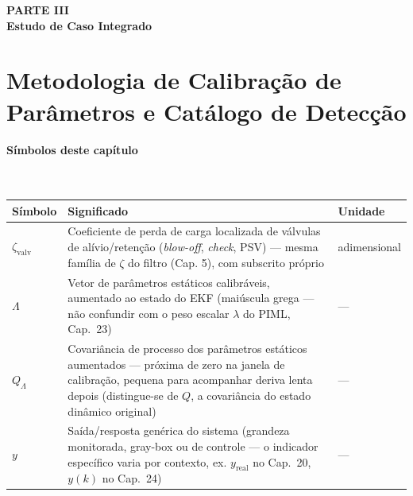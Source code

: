 \documentclass[12pt,a4paper]{article}
\numberwithin{equation}{section}
\numberwithin{table}{section}
\numberwithin{figure}{section}
\begin{document}
\clearpage
\thispagestyle{empty}
{}
\vspace*{\fill}
\begin{center}
	{\Huge\bfseries PARTE III}\\[2em]
	{\huge\bfseries Estudo de Caso Integrado}
\end{center}
\vspace*{\fill}
\clearpage


\clearpage
\section{Metodologia de Calibração de Parâmetros e Catálogo de Detecção}

\paragraph{Símbolos deste capítulo}\mbox{}\\[-0.5em]
{\small
\begin{longtable}{>{\raggedright\arraybackslash}p{2.6cm} >{\raggedright\arraybackslash}p{9.2cm} >{\raggedright\arraybackslash}p{2.6cm}}
	\toprule
	\textbf{Símbolo} & \textbf{Significado} & \textbf{Unidade} \\ \midrule
	\endhead
	$\zeta_{\text{valv}}$\dag & Coeficiente de perda de carga localizada de válvulas de alívio/retenção (\textit{blow-off}, \textit{check}, PSV) — mesma família de $\zeta$ do filtro (Cap. 5), com subscrito próprio & adimensional \\
	$\Lambda$ & Vetor de parâmetros estáticos calibráveis, aumentado ao estado do EKF (maiúscula grega — não confundir com o peso escalar $\lambda$ do PIML, Cap.~23) & --- \\
	$Q_\Lambda$\dag & Covariância de processo dos parâmetros estáticos aumentados — próxima de zero na janela de calibração, pequena para acompanhar deriva lenta depois (distingue-se de $Q$, a covariância do estado dinâmico original) & --- \\
	$y$ & Saída/resposta genérica do sistema (grandeza monitorada, gray-box ou de controle — o indicador específico varia por contexto, ex. $y_{\text{real}}$ no Cap.~20, $y(k)$ no Cap.~24) & --- \\
	\bottomrule
\end{longtable}
}
\end{document}
